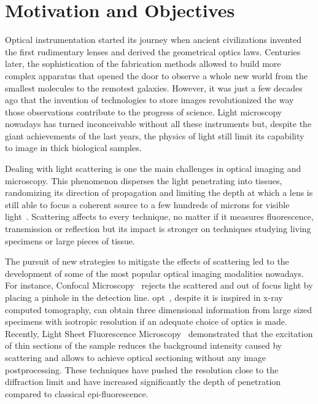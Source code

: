 \chapter*{Motivation and Objectives}

Optical instrumentation started its journey when ancient civilizations invented the first rudimentary lenses and derived the geometrical optics laws. Centuries later, the sophistication of the fabrication methods allowed to build more complex apparatus that opened the door to observe a whole new world from the smallest molecules to the remotest galaxies. However, it was just a few decades ago that the invention of technologies to store images revolutionized the way those observations contribute to the progress of science. Light microscopy nowadays has turned inconceivable without all these instruments but, despite the giant achievements of the last years, the physics of light still limit its capability to image in thick biological samples.

Dealing with light scattering is one the main challenges in optical imaging and microscopy. This phenomenon disperses the light penetrating into tissues, randomizing its direction of propagation and limiting the depth at which a lens is still able to focus a coherent source to a few hundreds of microns for visible light~\cite{Ntziachristos2010}. Scattering affects to every technique, no matter if it measures fluorescence, transmission or reflection but its impact is stronger on techniques studying living specimens or large pieces of tissue.

The pursuit of new strategies to mitigate the effects of scattering led to the development of some of the most popular optical imaging modalities nowadays. For instance, Confocal Microscopy~\cite{Pawley2006Confocal} rejects the scattered and out of focus light by placing a pinhole in the detection line. \acrfull{opt}~\cite{Sharpe2002}, despite it is inspired in x-ray computed tomography, can obtain three dimensional information from large sized specimens with isotropic resolution if an adequate choice of optics is made. Recently, Light Sheet Fluorescence Microscopy~\cite{Huisken2004} demonstrated that the excitation of thin sections of the sample reduces the background intensity caused by scattering and allows to achieve optical sectioning without any image postprocessing. These techniques have pushed the resolution close to the diffraction limit and have increased significantly the depth of penetration compared to classical epi-fluorescence. 

